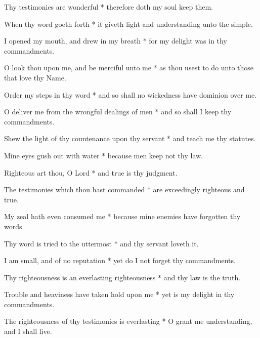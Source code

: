 Thy testimonies are wonderful * therefore doth my soul keep them.

When thy word goeth forth * it giveth light and understanding unto the simple.

I opened my mouth, and drew in my breath * for my delight was in thy commandments.

O look thou upon me, and be merciful unto me * as thou usest to do unto those that love thy Name.

Order my steps in thy word * and so shall no wickedness have dominion over me.

O deliver me from the wrongful dealings of men * and so shall I keep thy commandments.

Shew the light of thy countenance upon thy servant * and teach me thy statutes.

Mine eyes gush out with water * because men keep not thy law.

Righteous art thou, O Lord * and true is thy judgment.

The testimonies which thou hast commanded * are exceedingly righteous and true.

My zeal hath even consumed me * because mine enemies have forgotten thy words.

Thy word is tried to the uttermost * and thy servant loveth it.

I am small, and of no reputation * yet do I not forget thy commandments.

Thy righteousness is an everlasting righteousness * and thy law is the truth.

Trouble and heaviness have taken hold upon me * yet is my delight in thy commandments.

The righteousness of thy testimonies is everlasting * O grant me understanding, and I shall live.